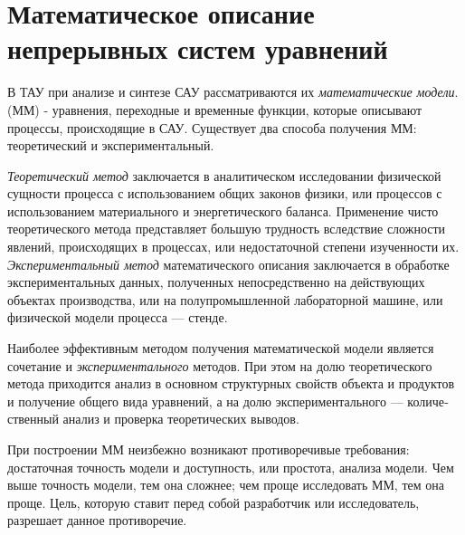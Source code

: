 \documentclass[../../TAU.tex]{subfiles}
\begin{document}
\chapter{Математическое описание непрерывных систем уравнений} %
    В ТАУ при анализе и синтезе САУ рассматриваются их {\it математические модели}.
     (ММ) - уравнения, переходные и временные функции, которые описывают процессы, происходящие в САУ.
    Существует два способа получения ММ: теоретический и экспериментальный.\par
    {\it Теоретический метод} заключается в аналитическом исследовании физической сущности процесса с использованием общих законов физики, или процессов с использованием материального и энергетического баланса. Применение чисто теоретического метода представляет большую трудность вследствие сложности явлений, происходящих в процессах, или недостаточной степени изученности их.
    {\it Экспериментальный метод} математического описания заклю­чается в обработке экспериментальных данных, полученных непо­средственно на действующих объектах производства, или на полу­промышленной лабораторной машине, или физической модели про­цесса — стенде.\par
    Наиболее эффективным методом получения математической модели является сочетание {} и {\it экспериментального} ме­тодов. При этом на долю теоретического метода приходится анализ в основном структурных свойств объекта и продуктов и получение общего вида уравнений, а на долю экспериментального — количе­ственный анализ и проверка теоретических выводов.\par
    При построении ММ неизбежно возникают противоречивые требования: достаточная точность модели и доступность, или простота, анализа модели. Чем выше точность модели, тем она сложнее; чем проще исследовать ММ, тем она проще. Цель, которую ставит перед собой разработчик или исследователь, разрешает данное противоречие. 
\end{document}
